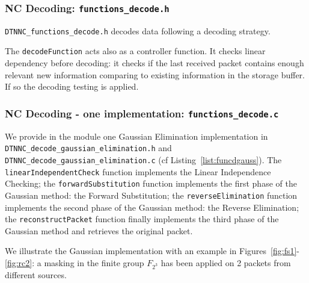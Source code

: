 \documentclass[a4paper,twoside]{article}
\begin{document}
\subsubsection{NC Decoding: \texttt{functions\_decode.h}}

\texttt{DTNNC\_functions\_decode.h} decodes data following a decoding strategy.

The \texttt{decodeFunction} acts also as a controller function. It checks linear dependency before decoding: it checks if the last received packet contains enough relevant new information comparing to existing information in the storage buffer. If so the decoding testing is applied.



\subsubsection{NC Decoding - one implementation: \texttt{functions\_decode.c}}

We provide in the module one Gaussian Elimination implementation in \texttt{DTNNC\_decode\_gaussian\_elimination.h} and \texttt{DTNNC\_decode\_gaussian\_elimination.c} (cf Listing~\ref{list:funcdgauss}). The \texttt{linearIndependentCheck} function implements the Linear Independence Checking; the \texttt{forwardSubstitution} function implements the first phase of the Gaussian method: the Forward Substitution; the \texttt{reverseElimination} function implements the second phase of the Gaussian method: the Reverse Elimination; the \texttt{reconstructPacket} function finally implements the third phase of the Gaussian method and retrieves the original packet.



We illustrate the Gaussian implementation with an example in Figures~\ref{fig:fs1}-\ref{fig:rc2}: a masking in the finite group $F_{2^3}$ has been applied on 2 packets from different sources.
\end{document}
